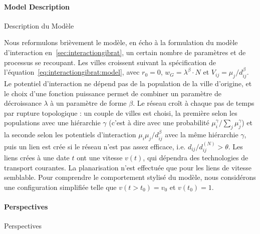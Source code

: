 \paragraph{Model Description}{Description du Modèle}

Nous reformulons brièvement le modèle, en écho à la formulation du modèle d'interaction en~\ref{sec:interactiongibrat}, un certain nombre de paramètres et de processus se recoupant. Les villes croissent suivant la spécification de l'équation~\ref{eq:interactiongibrat:model}, avec $r_0 = 0$, $w_G = \lambda^\beta \cdot N$ et $V_{ij} = \mu_j / d_{ij}^\beta$. Le potentiel d'interaction ne dépend pas de la population de la ville d'origine, et le choix d'une fonction puissance permet de combiner un paramètre de décroissance $\lambda$ à un paramètre de forme $\beta$. Le réseau croît à chaque pas de temps par rupture topologique : un couple de villes est choisi, la première selon les populations avec une hiérarchie $\gamma$ (c'est à dire avec une probabilité $\mu_i^\gamma / \sum_j \mu_j^\gamma$) et la seconde selon les potentiels d'interaction $\mu_i \mu_j / d_{ij}^\beta$ avec la même hiérarchie $\gamma$, puis un lien est crée si le réseau n'est pas assez efficace, i.e. $d_{ij}/d^{(N)}_{ij}> \theta$. Les liens crées à une date $t$ ont une vitesse $v(t)$, qui dépendra des technologies de transport courantes. La planarisation n'est effectuée que pour les liens de vitesse semblable. Pour comprendre le comportement stylisé du modèle, nous considérons une configuration simplifiée telle que $v(t > t_0) = v_0$ et $v(t_0) = 1$.




\paragraph{Perspectives}{Perspectives}

